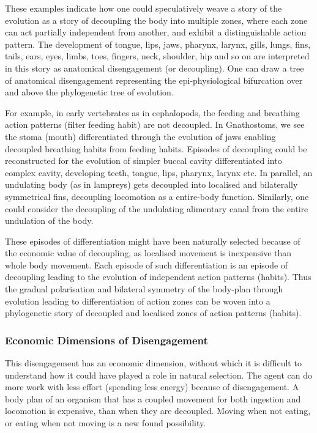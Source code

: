 These examples indicate how one could speculatively weave a story of the evolution as a story of decoupling the body into multiple zones, where each zone can act partially independent from another, and exhibit a distinguishable action pattern. The development of tongue, lips, jaws, pharynx, larynx, gills, lungs, fins, tails, ears, eyes, limbs, toes, fingers, neck, shoulder, hip and so on are interpreted in this story as anatomical disengagement (or decoupling). One can draw a tree of anatomical disengagement representing the epi-physiological bifurcation over and above the phylogenetic tree of evolution.

For example, in early vertebrates as in cephalopods, the feeding and breathing action patterns (filter feeding habit) are not decoupled. In Gnathostoms, we see the stoma (mouth) differentiated through the evolution of jaws enabling decoupled breathing habits from feeding habits. Episodes of decoupling could be reconstructed for the evolution of simpler buccal cavity differentiated into complex cavity, developing teeth, tongue, lips, pharynx, larynx etc. In parallel, an undulating body (as in lampreys) gets decoupled into localised and bilaterally symmetrical fins, decoupling locomotion as a entire-body function. Similarly, one could consider the decoupling of the undulating alimentary canal from the entire undulation of the body.

These episodes of differentiation might have been naturally selected because of the economic value of decoupling, as localised movement is inexpensive than whole body movement. Each episode of such differentiation is an episode of decoupling leading to the evolution of independent action patterns (habits). Thus the gradual polarisation and bilateral symmetry of the body-plan through evolution leading to differentiation of action zones can be woven into a phylogenetic story of decoupled and localised zones of action patterns (habits).

\subsubsection{Economic Dimensions of Disengagement}
This disengagement has an economic dimension, without which it is difficult to understand how it could have played a role in natural selection. The agent can do more work with less effort (spending less energy) because of disengagement. A body plan of an organism that has a coupled movement for both ingestion and locomotion is expensive, than when they are decoupled. Moving when not eating, or eating when not moving is a new found possibility.

